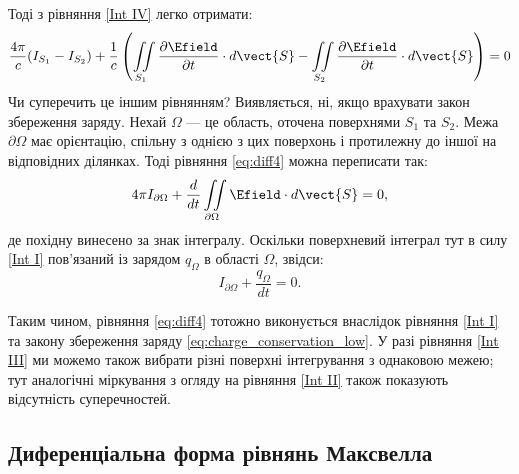 Тоді з рівняння \eqref{Int IV} легко отримати:
\begin{equation}\label{eq:diff4}
    \frac{4\pi}c(I_{S_1} - I_{S_2}) +\frac1c \left( \iint\limits_{S_1}
	\frac{\partial\Efield}{\partial t}\cdot d\vect{S}  - \iint\limits_{S_2}
	\frac{\partial\Efield}{\partial t}\cdot d\vect{S}  \right) = 0
\end{equation}
Чи суперечить це іншим рівнянням? Виявляється, ні, якщо врахувати закон збереження заряду. Нехай $\Omega$ --- це область, оточена поверхнями $S_1$ та
$S_2$. Межа $\partial\Omega$ має орієнтацію, спільну з однією з цих поверхонь і протилежну до іншої на відповідних ділянках. Тоді рівняння
\eqref{eq:diff4} можна переписати так:
\begin{equation}
    4\pi I_{\partial\Omega} + \frac{d}{dt} \iint\limits_{\partial\Omega} \Efield\cdot d\vect{S} = 0,
\end{equation}
де похідну винесено за знак інтегралу. Оскільки поверхневий інтеграл тут в силу \eqref{Int I} пов’язаний із зарядом $q_{\Omega}$ в області $\Omega$,
звідси:
\begin{equation}\label{eq:charge_conservation_low}
    I_{\partial\Omega} + \frac{q_{\Omega}}{dt} = 0.
\end{equation}

Таким чином, рівняння \eqref{eq:diff4} тотожно виконується внаслідок рівняння
\eqref{Int I} та закону збереження заряду \eqref{eq:charge_conservation_low}.
У разі рівняння \eqref{Int III} ми можемо також вибрати різні поверхні
інтегрування з однаковою межею; тут аналогічні міркування з огляду на
рівняння \eqref{Int II} також показують відсутність суперечностей.


\subsection*{Диференціальна форма рівнянь Максвелла}


